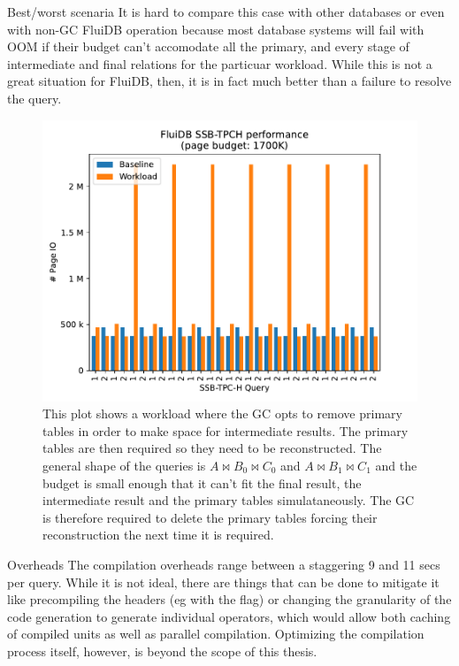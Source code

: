 \begin{correction}{Best/worst scenaria}
It is hard to compare this case with other databases or even with
non-GC FluiDB operation because most database systems will fail with
OOM if their budget can't accomodate all the primary, and every stage
of intermediate and final relations for the particuar workload. While
this is not a great situation for FluiDB, then, it is in fact much
better than a failure to resolve the query.

\begin{figure}[H]
\centering
\includegraphics[width=.9\linewidth]{./plans/workload_1700K.pdf}
\caption{\label{fig:gc_enemy}This plot shows a workload where the GC
  opts to remove primary tables in order to make space for
  intermediate results. The primary tables are then required so they
  need to be reconstructed. The general shape of the queries is
  \(A \Join B_0 \Join C_0\) and \(A \Join B_1 \Join C_1\) and the
  budget is small enough that it can't fit the final result, the
  intermediate result and the primary tables simulataneously. The GC
  is therefore required to delete the primary tables forcing their
  reconstruction the next time it is required.}
\end{figure}
\end{correction}


\begin{correction}{Overheads}
  The compilation overheads range between a staggering 9 and 11 secs
  per query. While it is not ideal, there are things that can be done
  to mitigate it like precompiling the headers (eg with the
   flag) or changing the granularity of the code
  generation to generate individual operators, which would allow both
  caching of compiled units as well as parallel
  compilation. Optimizing the compilation process itself, however, is
  beyond the scope of this thesis.
\end{correction}


